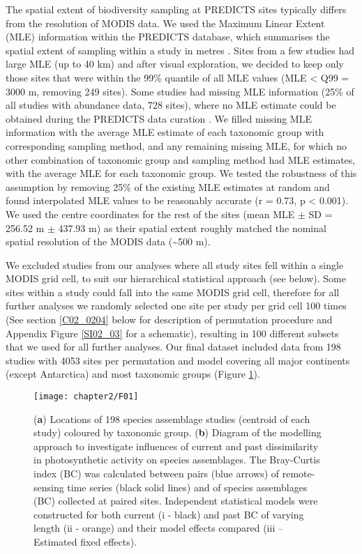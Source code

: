 The spatial extent of biodiversity sampling at PREDICTS sites typically differs from the resolution of MODIS data. We used the Maximum Linear Extent (MLE) information within the PREDICTS database, which summarises the spatial extent of sampling within a study in metres \citep{Hudson2016}. Sites from a few studies had large MLE (up to 40 km) and after visual exploration, we decided to keep only those sites that were within the 99\% quantile of all MLE values (MLE < Q99 = 3000 m, removing 249 sites). Some studies had missing MLE information (25\% of all studies with abundance data, 728 sites), where no MLE estimate could be obtained during the PREDICTS data curation \citep{Hudson2016}. We filled missing MLE information with the average MLE estimate of each taxonomic group with corresponding sampling method, and any remaining missing MLE, for which no other combination of taxonomic group and sampling method had MLE estimates, with the average MLE for each taxonomic group. We tested the robustness of this assumption by removing 25\% of the existing MLE estimates at random and found interpolated MLE values to be reasonably accurate (r = 0.73, p < 0.001). We used the centre coordinates for the rest of the sites (mean MLE $\pm$ SD = 256.52 m $\pm$ 437.93 m) as their spatial extent roughly matched the nominal spatial resolution of the MODIS data (\textasciitilde 500 m). 

We excluded studies from our analyses where all study sites fell within a single MODIS grid cell, to suit our hierarchical statistical approach (see below). Some sites within a study could fall into the same MODIS grid cell, therefore for all further analyses we randomly selected one site per study per grid cell 100 times (See section \ref{C02_0204} below for description of permutation procedure and Appendix Figure \ref{SI02_03} for a schematic), resulting in 100 different subsets that we used for all further analyses. Our final dataset included data from 198 studies with 4053 sites per permutation and model covering all major continents (except Antarctica) and most taxonomic groups (Figure \ref{F02_01}).

\begin{figure}[ht]
\centering
\texttt{[image: chapter2/F01]}
\caption{ (\textbf{a}) Locations of 198 species assemblage studies (centroid of each study) coloured by taxonomic group. (\textbf{b}) Diagram of the modelling approach to investigate influences of current and past dissimilarity in photosynthetic activity on species assemblages. The Bray-Curtis index (BC) was calculated between pairs (blue arrows) of remote-sensing time series (black solid lines) and of species assemblages (BC) collected at paired sites. Independent statistical models were constructed for both current (i - black) and past BC of varying length (ii - orange) and their model effects compared (iii – Estimated fixed effects).}
\label{F02_01}
\end{figure}


